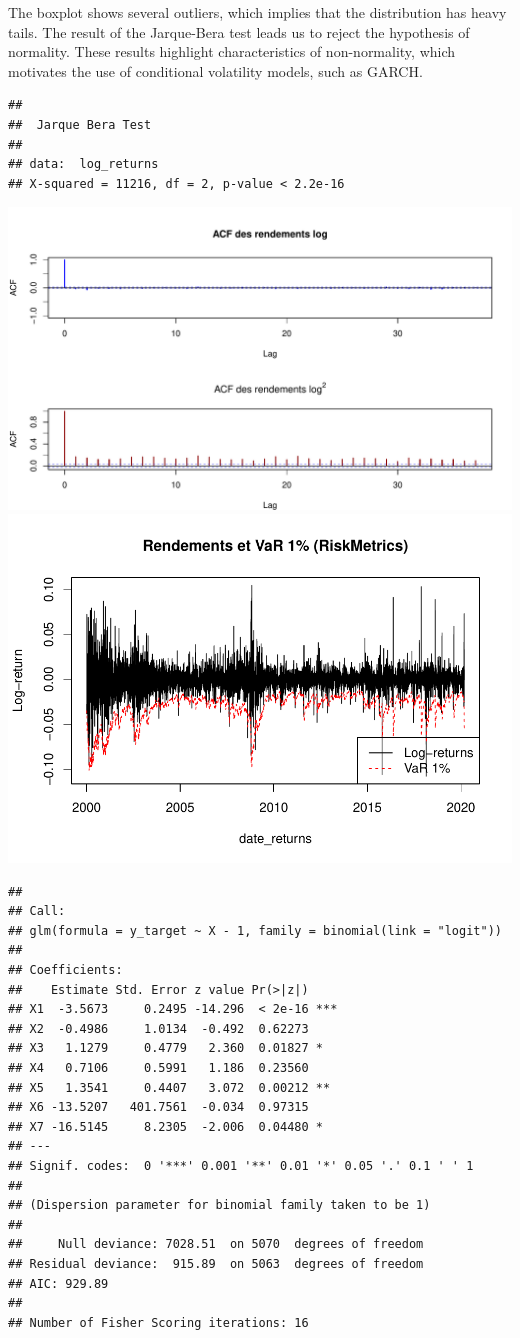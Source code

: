\documentclass[
  12pt,
]{article}
\begin{document}
The boxplot shows several outliers, which implies that the distribution
has heavy tails. The result of the Jarque-Bera test leads us to reject
the hypothesis of normality. These results highlight characteristics of
non-normality, which motivates the use of conditional volatility models,
such as GARCH.

\begin{verbatim}
## 
##  Jarque Bera Test
## 
## data:  log_returns
## X-squared = 11216, df = 2, p-value < 2.2e-16
\end{verbatim}

\includegraphics{QRM_files/figure-latex/unnamed-chunk-5-1.pdf}
\includegraphics{QRM_files/figure-latex/unnamed-chunk-6-1.pdf}

\begin{verbatim}
## 
## Call:
## glm(formula = y_target ~ X - 1, family = binomial(link = "logit"))
## 
## Coefficients:
##    Estimate Std. Error z value Pr(>|z|)    
## X1  -3.5673     0.2495 -14.296  < 2e-16 ***
## X2  -0.4986     1.0134  -0.492  0.62273    
## X3   1.1279     0.4779   2.360  0.01827 *  
## X4   0.7106     0.5991   1.186  0.23560    
## X5   1.3541     0.4407   3.072  0.00212 ** 
## X6 -13.5207   401.7561  -0.034  0.97315    
## X7 -16.5145     8.2305  -2.006  0.04480 *  
## ---
## Signif. codes:  0 '***' 0.001 '**' 0.01 '*' 0.05 '.' 0.1 ' ' 1
## 
## (Dispersion parameter for binomial family taken to be 1)
## 
##     Null deviance: 7028.51  on 5070  degrees of freedom
## Residual deviance:  915.89  on 5063  degrees of freedom
## AIC: 929.89
## 
## Number of Fisher Scoring iterations: 16
\end{verbatim}
\end{document}
